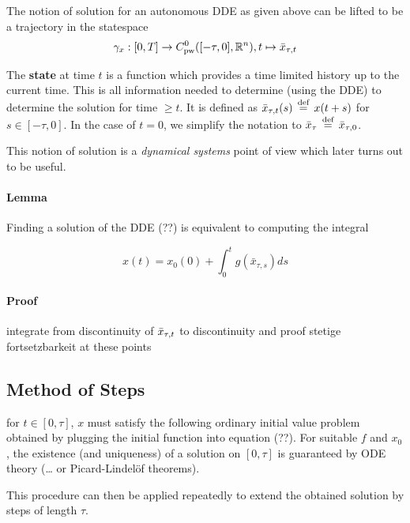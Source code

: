 \documentclass[10pt]{article}
\begin{document}
The notion of solution for an autonomous DDE as given above can be lifted to be a trajectory in the statespace
\begin{equation}
    \gamma_x:[0,T]\rightarrow C^0_\text{pw}([-\tau,0],\mathbb{R}^n),\\ t\mapsto\bar{x}_{\tau,t}
\end{equation}

The \textbf{state} at time $t$ is a function which provides a time limited history up to the current time. This is all information needed to determine (using the DDE) to determine the solution for time $\geq t$. It is defined as $\bar{x}_{\tau,t}(s)\,\stackrel{\text{def}}{=}\, x(t+s)$ for $s\in [-\tau,0]$. In the case of $t=0$, we simplify the notation to $\bar{x}_{\tau} \,\stackrel{\text{def}}{=}\, \bar{x}_{\tau,0}$.

This notion of solution is a \emph{dynamical systems} point of view which later turns out to be useful.

\paragraph{Lemma}\label{lemma}


Finding a solution of the DDE (??) is equivalent to computing the integral

\begin{equation}
    x(t) = x_0(0) + \int_0^t g(\bar{x}_{\tau,s})ds
\end{equation}

\paragraph{Proof}\label{proof}

integrate from discontinuity of $\bar{x}_{\tau,t}$ to discontinuity and proof stetige fortsetzbarkeit at these points

\subsection{Method of Steps}\label{method-of-steps}
for $t\in [0,\tau]$, $x$ must satisfy the following ordinary initial value problem obtained by plugging the initial function into equation (??). For suitable $f$ and $x_0$, the existence (and uniqueness) of a solution on $[0,\tau]$ is guaranteed by ODE theory (\ldots{} or Picard-Lindelöf theorems).

This procedure can then be applied repeatedly to extend the obtained solution by steps of length $\tau$.
\end{document}
